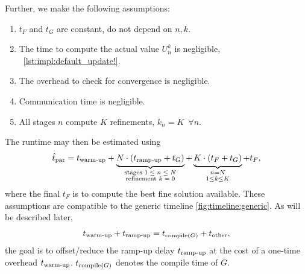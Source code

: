 \pagebreak
\noindent
Further, we make the following assumptions:
\begin{enumerate}
  \item
    \label{item:impl:assumption:tF}
    $t_F$ and $t_G$ are constant, \ie do not depend on $n, k$.
  \item
    \label{item:impl:assumption:tU}
    The time to compute the actual value $U_n^k$ is negligible,
    \cf~\autoref{lst:impl:default_update!}.
  \item
    The overhead to check for convergence is negligible.
  \item
    Communication time is negligible.
  \item
    All stages $n$ compute $K$ refinements, \ie $k_n = K \enspace\forall n$.
\end{enumerate}
The runtime may then be estimated using
\begin{equation}
\label{eq:impl:tpar}
  \hattpar
  = \twarmup
  + \underbrace{
    \strut
    N \cdot (\trampup + t_G)
  }_{\substack{
    \text{stages $1\leq n\leq N$}\\
    \text{refinement $k=0$}
  }}
  + \underbrace{
    \strut
    K \cdot (t_F + t_G)
  }_{\substack{
    \vphantom{\text{stage}}
    n = N \\
    1 \leq k \leq K
  }}
  + t_F
  ,
\end{equation}
where the final $t_F$ is to compute the best fine solution available.
These assumptions are compatible to the generic timeline \autoref{fig:timeline:generic}.
As will be described later,
\begin{equation}
  t_\text{warm-up} + t_\text{ramp-up}
  = t_{\operatorname{compile}(G)} + t_\text{other}
  ,
\end{equation}
\ie the goal is to offset/reduce the ramp-up delay $t_\text{ramp-up}$
at the cost of a one-time overhead $t_\text{warm-up}$.
$t_{\operatorname{compile}(G)}$ denotes the compile time of $G$.

